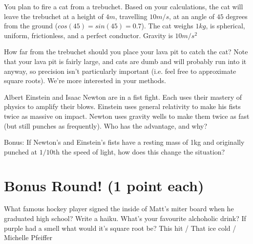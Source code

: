 \documentclass[11pt]{exam}
\begin{document}
\begin{questions}
\newpage
\question[9] You plan to fire a cat from a trebuchet. Based on your calculations, the cat
will leave the trebuchet at a height of $4m$, travelling $10m/s$, at an angle of
$45$ degrees from the ground ($cos(45) = sin(45) = 0.7$). The cat weighs $1kg$,
is spherical, uniform, frictionless, and a perfect conductor. Gravity is $10m/s^2$

How far from the trebuchet should you place your lava pit to catch the cat? Note
that your lava pit is fairly large, and cats are dumb and will probably run into
it anyway, so precision isn't particularly important (i.e. feel free to approximate square
roots). We're more interested in
your methods.







\newpage
\question[3] Albert Einstein and Isaac Newton are in a fist fight. Each uses their
mastery of physics to amplify their blows. Einstein uses general relativity to
make his fists twice as massive on impact. Newton uses gravity wells to make them twice as
fast (but still punches as frequently). Who has the advantage, and why?
\vfill





\question[3] Bonus: If Newton's and Einstein's fists have a resting mass of 1kg and
originally punched at $1/10$th the speed of light, how does this change the situation?
\vfill

\newpage
\section{Bonus Round! (1 point each)}
\setcounter{question}{0}
\question What famous hockey player signed the inside of Matt's miter board when he graduated high school? 
\vspace{2cm}
\question Write a haiku.
\vspace{5cm}
\question What's your favourite alchoholic drink? 
\vspace{2cm}
\question If purple had a smell what would it's square root be? 
\vspace{2cm}
\question This hit / That ice cold / Michelle Pfeiffer
\vspace{2cm}


\end{questions}
\end{document}
